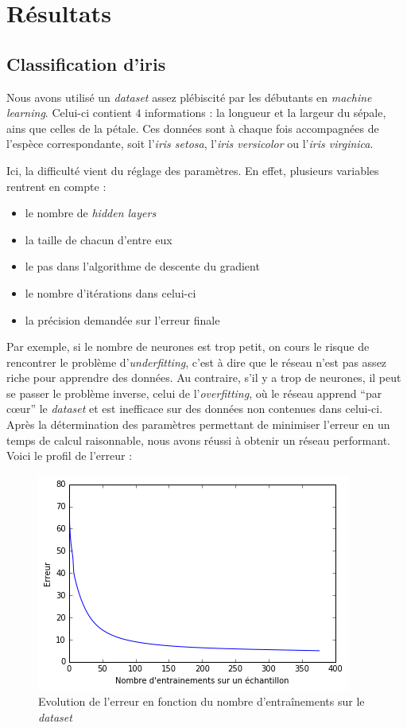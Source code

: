 \documentclass[a4paper,10pt]{article}
\begin{document}
\section{Résultats}

\subsection{Classification d'iris}

Nous avons utilisé un \textit{dataset} assez plébiscité par les débutants en \textit{machine learning}. Celui-ci contient $4$ 
informations : la longueur et la largeur du sépale, ains que celles de la pétale. Ces données sont à chaque fois accompagnées 
de l'espèce correspondante, soit l'\textit{iris setosa}, l'\textit{iris versicolor} ou l'\textit{iris virginica}.

Ici, la difficulté vient du réglage des paramètres. En effet, plusieurs variables rentrent en compte :
\begin{itemize}
 \item le nombre de \textit{hidden layers}
 \item la taille de chacun d'entre eux
 \item le pas dans l'algorithme de descente du gradient
 \item le nombre d'itérations dans celui-ci
 \item la précision demandée sur l'erreur finale
\end{itemize}

Par exemple, si le nombre de neurones est trop petit, on cours le risque de rencontrer le problème d'\textit{underfitting}, c'est à dire
que le réseau n'est pas assez riche pour apprendre des données. Au contraire, s'il y a trop de neurones, il peut 
se passer le problème inverse, celui de l'\textit{overfitting}, où le réseau apprend ``par cœur'' le \textit{dataset} et est inefficace 
sur des données non contenues dans celui-ci. \\
Après la détermination des paramètres permettant de minimiser l'erreur en un temps de calcul raisonnable, nous avons réussi à obtenir un 
réseau performant. Voici le profil de l'erreur :
\begin{figure}[H]
\centering
\captionsetup{justification=centering,margin=2cm}
\includegraphics[scale = 0.6]{erreur_iris}
\caption{Evolution de l'erreur en fonction du nombre d'entraînements sur le \textit{dataset}}
 
\end{figure}
\end{document}
